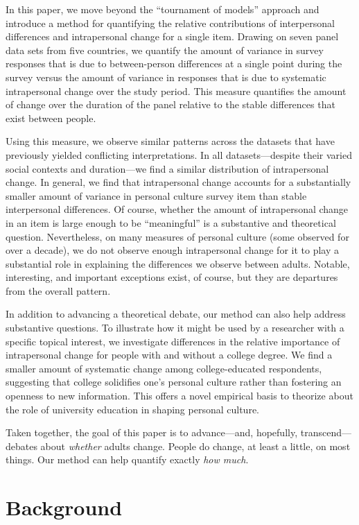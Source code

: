 \documentclass[
  12pt,
]{article}
\begin{document}
In this paper, we move beyond the ``tournament of models'' approach and
introduce a method for quantifying the relative contributions of
interpersonal differences and intrapersonal change for a single item.
Drawing on seven panel data sets from five countries, we quantify the
amount of variance in survey responses that is due to between-person
differences at a single point during the survey versus the amount of
variance in responses that is due to systematic intrapersonal change
over the study period. This measure quantifies the amount of change over
the duration of the panel relative to the stable differences that exist
between people.

Using this measure, we observe similar patterns across the datasets that
have previously yielded conflicting interpretations. In all
datasets---despite their varied social contexts and duration---we find a
similar distribution of intrapersonal change. In general, we find that
intrapersonal change accounts for a substantially smaller amount of
variance in personal culture survey item than stable interpersonal
differences. Of course, whether the amount of intrapersonal change in an
item is large enough to be ``meaningful'' is a substantive and
theoretical question. Nevertheless, on many measures of personal culture
(some observed for over a decade), we do not observe enough
intrapersonal change for it to play a substantial role in explaining the
differences we observe between adults. Notable, interesting, and
important exceptions exist, of course, but they are departures from the
overall pattern.

In addition to advancing a theoretical debate, our method can also help
address substantive questions. To illustrate how it might be used by a
researcher with a specific topical interest, we investigate differences
in the relative importance of intrapersonal change for people with and
without a college degree. We find a smaller amount of systematic change
among college-educated respondents, suggesting that college solidifies
one's personal culture rather than fostering an openness to new
information. This offers a novel empirical basis to theorize about the
role of university education in shaping personal culture.

Taken together, the goal of this paper is to advance---and, hopefully,
transcend---debates about \emph{whether} adults change. People do
change, at least a little, on most things. Our method can help quantify
exactly \emph{how much}.

\hypertarget{background}{%
\section{Background}\label{background}}
\end{document}
